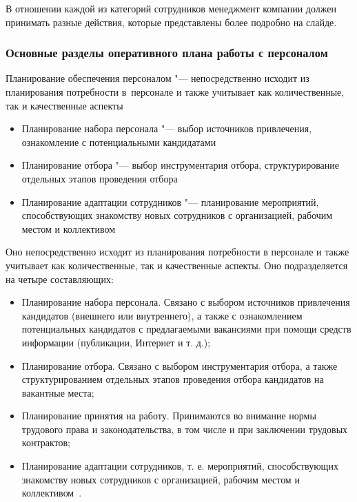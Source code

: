 \documentclass{../industrial-development}
\begin{document}
\lecturenotes

В отношении каждой из категорий сотрудников менеджмент компании должен принимать разные действия, которые представлены более подробно на слайде.


\begin{frame} \frametitle{Основные разделы оперативного плана работы с персоналом}
\alert{Планирование обеспечения персоналом} "--- непосредственно исходит из планирования потребности в~персонале и также учитывает как количественные, так и качественные аспекты
  	  \begin{itemize}
		\item {\small Планирование набора персонала "--- выбор источников привлечения, ознакомление с потенциальными кандидатами}
		\item {\small Планирование отбора "--- выбор инструментария отбора, структурирование отдельных этапов проведения отбора}
		\item {\small Планирование адаптации сотрудников "--- планирование мероприятий, способствующих знакомству новых сотрудников с организацией, рабочим местом и коллективом}
	 
		
	  \end{itemize}
\end{frame}


\lecturenotes

Оно непосредственно исходит из планирования потребности в персонале и также учитывает как количественные, так и качественные аспекты. Оно подразделяется на четыре составляющих:
	  \begin{itemize}
\item Планирование набора персонала. Связано с выбором источников привлечения кандидатов (внешнего или внутреннего), а также с ознакомлением потенциальных кандидатов с предлагаемыми вакансиями при помощи средств информации (публикации, Интернет и т. д.);
	
\item Планирование отбора. Связано с выбором инструментария отбора, а также структурированием отдельных этапов проведения отбора кандидатов на вакантные места;

\item Планирование принятия на работу. Принимаются во внимание нормы трудового права и законодательства, в том числе и при заключении трудовых контрактов;

\item Планирование адаптации сотрудников, т. е. мероприятий, способствующих знакомству новых сотрудников с организацией, рабочим местом и коллективом~\cite{Durakova}.
  \end{itemize}
\end{document}
